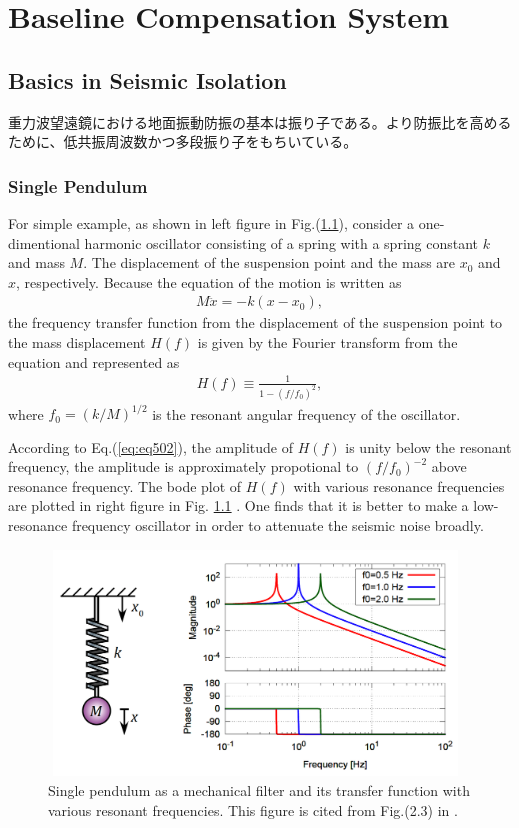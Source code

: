 \chapter{Baseline Compensation System}



\section{Basics in Seismic Isolation}\label{sec:51}
重力波望遠鏡における地面振動防振の基本は振り子である。より防振比を高めるために、低共振周波数かつ多段振り子をもちいている。


\subsection{Single Pendulum}
For simple example, as shown in left figure in Fig.(\ref{img:img501}), consider a one-dimentional harmonic oscillator consisting of a spring with a spring constant $k$ and mass $M$. The displacement of the suspension point and the mass are $x_0$ and $x$, respectively. Because the equation of the motion is written as
\begin{eqnarray} \label{eq:eq501}
  M\ddot{x} = -k(x-x_0),
\end{eqnarray}
the frequency transfer function from the displacement of the suspension point to the mass displacement $H(f)$ is given by the Fourier transform from the equation and represented as
\begin{eqnarray} \label{eq:eq502}
  H(f) \equiv \frac{1}{1-(f/f_0)^2},
\end{eqnarray}
where $f_0 = (k/M)^{1/2}$ is the resonant angular frequency of the oscillator.

According to Eq.(\ref{eq:eq502}), the amplitude of $H(f)$ is unity below the resonant frequency, the amplitude is approximately propotional to $(f/f_0)^{-2}$ above resonance frequency. The bode plot of $H(f)$ with various resonance frequencies are plotted in right figure in Fig. \ref{img:img501} . One finds that it is better to make a low-resonance frequency oscillator in order to attenuate the seismic noise broadly. 

\begin{figure}[h]
  \begin{center}   
    \includegraphics[width=11cm,height=6cm]{./img_chap5/img501.png}
    \caption{Single pendulum as a mechanical filter and its transfer function with various resonant frequencies. This figure is cited from Fig.(2.3) in \cite{sekiguchi2016astudy}.} \label{img:img501}
  \end{center}
\end{figure}

